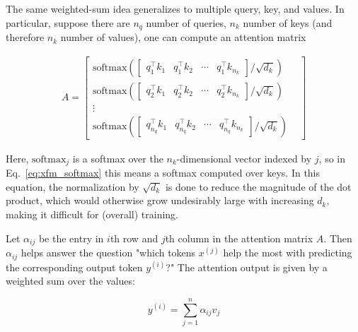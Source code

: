 The same weighted-sum idea generalizes to multiple query, key, and values. In particular, suppose there are $n_q$ number of queries, $n_k$ number of keys (and therefore $n_k$ number of values), one can compute an attention matrix

\begin{eqnarray}A = \begin{bmatrix}
    \text{softmax}\left( \begin{bmatrix}
                           q_1^\top k_1 & q_1^\top k_2 & \cdots & q_1^\top k_{n_k}
                         \end{bmatrix} / \sqrt{d_k} \right) \\
    \text{softmax}\left( \begin{bmatrix}
                           q_2^\top k_1 & q_2^\top k_2 & \cdots & q_2^\top k_{n_k}
                         \end{bmatrix} / \sqrt{d_k} \right) \\
    \vdots &                                                                     \\
    \text{softmax}\left( \begin{bmatrix}
                           q_{n_q}^\top k_1 & q_{n_q}^\top k_2 & \cdots & q_{n_q}^\top k_{n_k}
                         \end{bmatrix} / \sqrt{d_k} \right)
  \end{bmatrix}
\end{eqnarray}\label{eq:xfm_softmax}

Here, $\text{softmax}_j$ is a softmax over the $n_k$-dimensional vector indexed by $j$, so in Eq.~\ref{eq:xfm_softmax} this means a softmax computed over keys.  In this equation, the normalization by $\sqrt{d_k}$ is done to reduce the magnitude of the dot product, which would otherwise grow undesirably large with increasing $d_k,$ making it difficult for (overall) training.

Let $\alpha_{ij}$ be the entry in $i$th row and $j$th column in the attention matrix $A$. Then $\alpha_{ij}$ helps answer the question "which tokens $x^{(j)}$ help the most with
predicting the corresponding output token $y^{(i)}$?" The attention output is given
by a weighted sum over the values:

$${y}^{(i)} = \sum_{j=1}^n  \alpha_{ij}
  v_{j}$$



